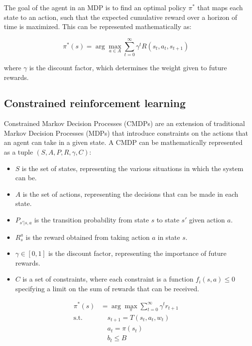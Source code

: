 \documentclass[
  12pt,
  a4paper,
  DIV=11,
  numbers=noendperiod]{scrartcl}
\providecommand{\tightlist}{%
  \setlength{\itemsep}{0pt}\setlength{\parskip}{0pt}}\usepackage{longtable,booktabs,array}
\begin{document}
The goal of the agent in an MDP is to find an optimal policy \(\pi^*\)
that maps each state to an action, such that the expected cumulative
reward over a horizon of time is maximized. This can be represented
mathematically as:

\[
\pi^*(s) = \arg\max_{a \in A} \sum_{t=0}^{\infty} \gamma^t R(s_t, a_t, s_{t+1})
\]

where \(\gamma\) is the discount factor, which determines the weight
given to future rewards.

\hypertarget{constrained-reinforcement-learning}{%
\subsection{Constrained reinforcement
learning}\label{constrained-reinforcement-learning}}

Constrained Markov Decision Processes (CMDPs) are an extension of
traditional Markov Decision Processes (MDPs) that introduce constraints
on the actions that an agent can take in a given state. A CMDP can be
mathematically represented as a tuple \((S,A,P,R,\gamma,C)\):

\begin{itemize}
\tightlist
\item
  \(S\) is the set of states, representing the various situations in
  which the system can be.
\item
  \(A\) is the set of actions, representing the decisions that can be
  made in each state.
\item
  \(P_{s'|s,a}\) is the transition probability from state \(s\) to state
  \(s'\) given action \(a\).
\item
  \(R_s^a\) is the reward obtained from taking action \(a\) in state
  \(s\).
\item
  \(\gamma \in [0,1]\) is the discount factor, representing the
  importance of future rewards.
\item
  \(C\) is a set of constraints, where each constraint is a function
  \(f_i(s,a) \le 0\) specifying a limit on the sum of rewards that can
  be received.
\end{itemize}

\[
\begin{aligned}
\pi^*(s) &= \arg\max_{\pi} \sum_{t=0}^{\infty} \gamma^t r_{t+1} \\
\text{s.t.} & \quad s_{t+1} = T(s_t, a_t, w_t) \\
& \quad a_t = \pi(s_t) \\
& \quad b_t \leq B
\end{aligned}
\]
\end{document}
